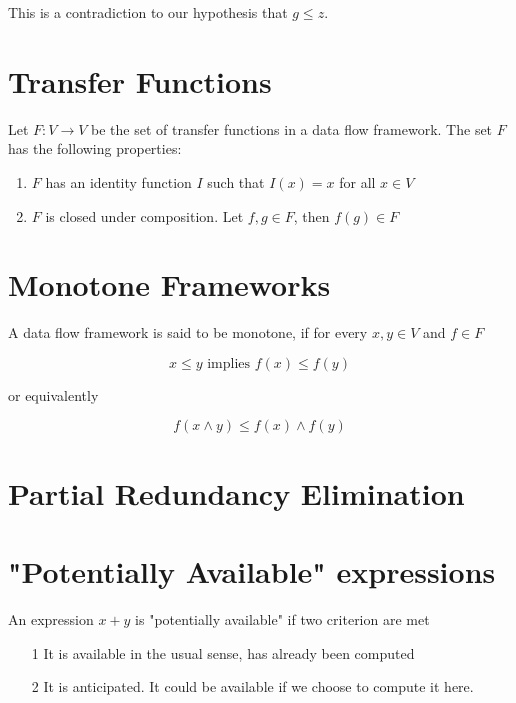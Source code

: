 \documentclass{article}
\begin{document}
This is a contradiction to our hypothesis that \(g \leq z\).

\section*{Transfer Functions}

Let \(F: V \rightarrow V\) be the set of transfer functions in a data flow
framework. The set \(F\) has the following properties:

\begin{enumerate}
    \item \(F\) has an identity function \(I\) such that \(I(x) = x\) for all \(x \in V\)
    \item \(F\) is closed under composition. Let \(f,g \in F\), then \(f(g) \in F\)
\end{enumerate}

\section*{Monotone Frameworks}

A data flow framework is said to be monotone, if for every \(x,y \in V\) and \(f \in F\)

\begin{equation}
    x \leq y \text{ implies } f(x) \leq f(y)
\end{equation}

or equivalently

\begin{equation}
    f(x \wedge y) \leq f(x) \wedge f(y)
\end{equation}

\section*{Partial Redundancy Elimination}

\section*{"Potentially Available" expressions}
An expression \(x + y\) is "potentially available" if two criterion are met
\begin{enumerate}
    \item[1] It is available in the usual sense, has already been computed
    \item[2] It is anticipated. It could be available if we choose to compute it here.
\end{enumerate}
\end{document}
